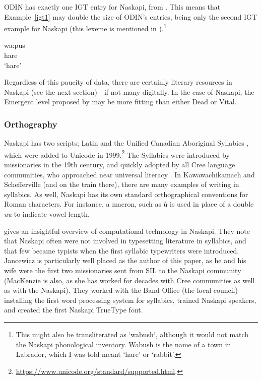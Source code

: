 ODIN has exactly one IGT entry for Naskapi, from \citet{richards2004syntax}. This means that Example~\ref{igt1} may double the size of ODIN's entries, being only the second IGT example for Naskapi (this lexeme is mentioned in \citet{macKenzie1980towards}).\footnote{This might also be transliterated as `wabush`, although it would not match the Naskapi phonological inventory. Wabush is the name of a town in Labrador, which I was told meant `hare' or `rabbit'.}

\begin{exe}
\ex
\gll wa:pus\\
hare\\
\trans `hare'
\label{igt1}
\end{exe}

Regardless of this paucity of data, there are certainly literary resources in Naskapi (see the next section) - if not many digitally. In the case of Naskapi, the Emergent level proposed by \citet{gibson2016assessing} may be more fitting than either Dead or Vital.

\subsubsection{Orthography}
Naskapi has two scripts; Latin and the Unified Canadian Aboriginal Syllabics \citep{wals-141}, which were added to Unicode in 1999.\footnote{\href{https://www.unicode.org/standard/supported.html}{https://www.unicode.org/standard/supported.html}. } The Syllabics were introduced by missionaries in the 19th century, and quickly adopted by all Cree language communities, who approached near universal literacy \citep{bennett1991cree}. In Kawawachikamach and Schefferville (and on the train there), there are many examples of writing in syllabics. As well, Naskapi has its own standard orthographical conventions for Roman characters. For instance, a macron, such as \^u is used in place of a double \emph{uu} to indicate vowel length.

\citet{jancewicz2002applied} gives an insightful overview of computational technology in Naskapi. They note that Naskapi often were not involved in typesetting literature in syllabics, and that few became typists when the first syllabic typewriters were introduced. Jancewicz is particularly well placed as the author of this paper, as he and his wife were the first two missionaries sent from SIL to the Naskapi community (MacKenzie is also, as she has worked for decades with Cree communities as well as with the Naskapi). They worked with the Band Office (the local council) installing the first word processing system for syllabics, trained Naskapi speakers, and created the first Naskapi TrueType font.


